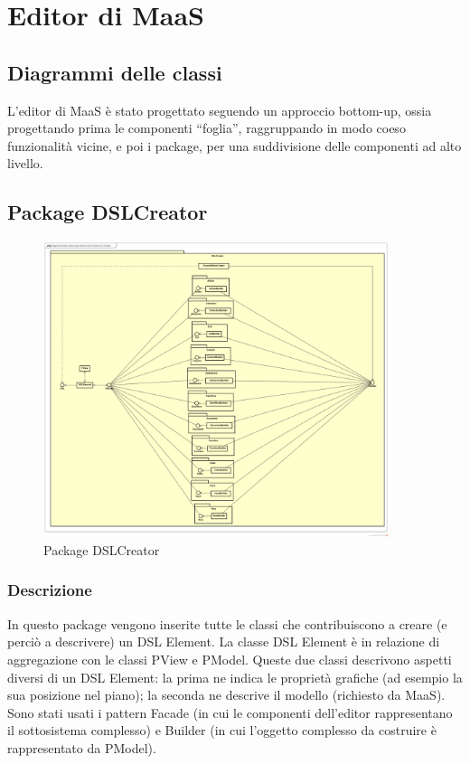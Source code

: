 \section{Editor di MaaS}
        \subsection{Diagrammi delle classi}
        L'editor di MaaS è stato progettato seguendo un approccio bottom-up, ossia progettando prima le componenti ``foglia'', raggruppando in modo coeso funzionalità vicine, e poi i package, per una suddivisione delle componenti ad alto livello.
        \subsection{Package DSLCreator}
        \begin{figure}[H]
          \centering
          \includegraphics[width=0.9\textwidth]{res/img/diagram_facade.png}
          \caption{Package DSLCreator}
          \label{fig:diagram_model}
        \end{figure}
        \subsubsection{Descrizione}
        In questo package vengono inserite tutte le classi che contribuiscono a creare (e perciò a descrivere) un DSL Element. La classe DSL Element è in relazione di aggregazione con le classi PView e PModel. Queste due classi descrivono aspetti diversi di un DSL Element: la prima ne indica le proprietà grafiche (ad esempio la sua posizione nel piano); la seconda ne descrive il modello (richiesto da MaaS).\\
        Sono stati usati i pattern Facade (in cui le componenti dell'editor rappresentano il sottosistema complesso) e Builder (in cui l'oggetto complesso da costruire è rappresentato da PModel).


